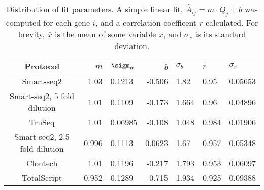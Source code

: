
\begin{table}[htdp]

\caption{Distribution of fit parameters. A simple linear fit,
             $\hat{A}_{ij} = m \cdot Q_{j} + b$
             was computed for each gene $i$, and a correlation coefficent $r$
             calculated.  For brevity,
             $\bar{x}$ is the mean of some variable $x$, and $\sigma_x$ is its
             standard deviation.  }
             \begin{center}
             \begin{tabular}{|c|r@{$\pm$}l|r@{$\pm$}l||}
             \hline Protocol & $\bar{m}$ & $\sigm_m$ & $\bar{b}$ & $\sigma_b$
                    & $\bar{r}$ & $\sigma_r$ \\\hline
             Smart-seq2 & 1.03 & 0.1213 & -0.506 & 1.82 & 0.95 & 0.05653 \\
Smart-seq2, 5 fold dilution & 1.01 & 0.1109 & -0.173 & 1.664 & 0.96 & 0.04896 \\
TruSeq & 1.01 & 0.06985 & -0.108 & 1.048 & 0.984 & 0.01906 \\
Smart-seq2, 2.5 fold dilution & 0.996 & 0.1113 & 0.0623 & 1.67 & 0.957 & 0.05348 \\
Clontech & 1.01 & 0.1196 & -0.217 & 1.793 & 0.953 & 0.06097 \\
TotalScript & 0.952 & 0.1289 & 0.715 & 1.934 & 0.925 & 0.09388 \\

\hline

\end{tabular}
\label{tab:fits}
\end{center}
\end{table}



              